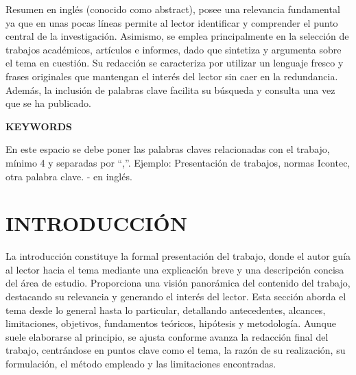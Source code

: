 \documentclass[12pt,a4paper,oneside]{report}
\begin{document}
Resumen en inglés (conocido como abstract), posee una relevancia fundamental ya que en unas pocas líneas permite al lector identificar y comprender el punto central de la investigación. Asimismo, se emplea principalmente en la selección de trabajos académicos, artículos e informes, dado que sintetiza y argumenta sobre el tema en cuestión. Su redacción se caracteriza por utilizar un lenguaje fresco y frases originales que mantengan el interés del lector sin caer en la redundancia. Además, la inclusión de palabras clave facilita su búsqueda y consulta una vez que se ha publicado.


\begin{center}
\textbf{\large KEYWORDS}
\end{center}

En este espacio se debe poner las palabras claves relacionadas con el trabajo, mínimo 4 y separadas por “,”. Ejemplo: Presentación de trabajos, normas Icontec, otra palabra clave. - en inglés.


\chapter*{\centering \large INTRODUCCIÓN} %

La introducción constituye la formal presentación del trabajo, donde el autor guía al lector hacia el tema mediante una explicación breve y una descripción concisa del área de estudio. Proporciona una visión panorámica del contenido del trabajo, destacando su relevancia y generando el interés del lector. Esta sección aborda el tema desde lo general hasta lo particular, detallando antecedentes, alcances, limitaciones, objetivos, fundamentos teóricos, hipótesis y metodología. Aunque suele elaborarse al principio, se ajusta conforme avanza la redacción final del trabajo, centrándose en puntos clave como el tema, la razón de su realización, su formulación, el método empleado y las limitaciones encontradas.

\end{document}
